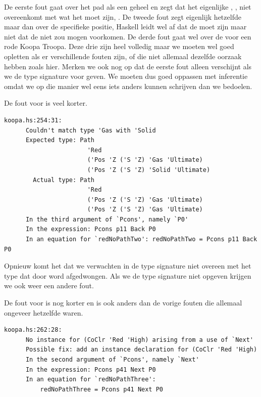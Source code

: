 De eerste fout gaat over het pad als een geheel en zegt dat het eigenlijke
, , niet overeenkomt met wat het moet zijn,
. De tweede fout zegt eigenlijk hetzelfde maar dan over de
specifieke positie, Haskell leidt wel af dat de  
moet zijn maar niet dat de   niet zou mogen
voorkomen. De derde fout gaat wel over de  voor een rode Koopa
Troopa. Deze drie zijn heel volledig maar we moeten wel goed opletten als er
verschillende fouten zijn, of die niet allemaal dezelfde oorzaak hebben zoals
hier. Merken we ook nog op dat de eerste fout alleen verschijnt als we de type
signature voor  geven. We moeten dus goed oppassen met
inferentie omdat we op die manier wel eens iets anders kunnen schrijven dan we
bedoelen.

De fout voor  is veel korter.

\begin{Verbatim}[fontsize=\small]
  koopa.hs:254:31:
      Couldn't match type 'Gas with 'Solid
      Expected type: Path
                       'Red
                       ('Pos 'Z ('S 'Z) 'Gas 'Ultimate)
                       ('Pos 'Z ('S 'Z) 'Solid 'Ultimate)
        Actual type: Path
                       'Red
                       ('Pos 'Z ('S 'Z) 'Gas 'Ultimate)
                       ('Pos 'Z ('S 'Z) 'Gas 'Ultimate)
      In the third argument of `Pcons', namely `P0'
      In the expression: Pcons p11 Back P0
      In an equation for `redNoPathTwo': redNoPathTwo = Pcons p11 Back P0
\end{Verbatim}

Opnieuw komt het  dat we verwachten in de type signature niet
overeen met het type dat door  word afgedwongen. Als we de type
signature niet opgeven krijgen we ook weer een andere fout.

De fout voor  is nog korter en is ook anders dan de
vorige fouten die allemaal ongeveer hetzelfde waren.

\begin{Verbatim}[fontsize=\small]
  koopa.hs:262:28:
      No instance for (CoClr 'Red 'High) arising from a use of `Next'
      Possible fix: add an instance declaration for (CoClr 'Red 'High)
      In the second argument of `Pcons', namely `Next'
      In the expression: Pcons p41 Next P0
      In an equation for `redNoPathThree':
          redNoPathThree = Pcons p41 Next P0
\end{Verbatim}

